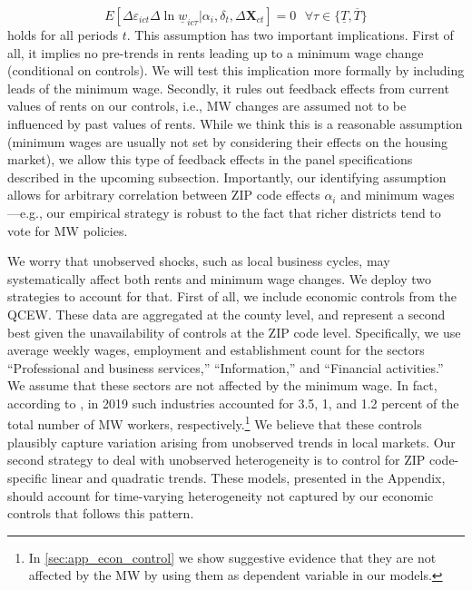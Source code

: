 \begin{equation*}
	E[\Delta \varepsilon_{ict} \Delta \ln \underline{w}_{ic\tau}  
							| \alpha_i, \delta_t, \Delta \mathbf{X}_{ct}] = 0
	\ \ \ \forall \tau \in \{\underline{T}, \overline{T} \}
\end{equation*}
holds for all periods $t$. This assumption has two important implications. First of all, 
it implies no pre-trends in rents leading up to a minimum wage change (conditional on 
controls). We will test this implication more formally by including leads of the minimum 
wage. Secondly, it rules out feedback effects from current values of rents on our controls, 
i.e., MW changes are assumed not to be influenced by past values of rents. While we think 
this is a reasonable assumption (minimum wages are usually not set by considering their 
effects on the housing market), we allow this type of feedback effects in the panel 
specifications described in the upcoming subsection. Importantly, our identifying assumption 
allows for arbitrary correlation between ZIP code effects $\alpha_i$ and minimum wages 
---e.g., our empirical strategy is robust to the fact that richer districts tend to vote 
for MW policies.


We worry that unobserved shocks, such as local business cycles, may systematically affect 
both rents and minimum wage changes. We deploy two strategies to account for that. First 
of all, we include economic controls from the QCEW. 
These data are aggregated at the county level, and represent a second best given the 
unavailability of controls at the ZIP code level. Specifically, we use average weekly wages, 
employment and establishment count for the sectors ``Professional and business services,'' 
``Information,'' and ``Financial activities.'' We assume that these sectors are not affected 
by the minimum wage. In fact, according to \textcite[][table 5]{MinWorkersReportBLS}, in 2019 
such industries accounted for 3.5, 1, and 1.2 percent of the total number of MW workers, 
respectively.\footnote{In \autoref{sec:app_econ_control} we show suggestive evidence 
	that they are not affected by the MW by using them as dependent variable in our models.}
We believe that these controls plausibly capture variation arising from unobserved trends 
in local markets. Our second strategy to deal with unobserved heterogeneity is to control for
ZIP code-specific linear and quadratic trends. These models, presented in the Appendix, 
should account for time-varying heterogeneity not captured by our economic controls that 
follows this pattern.

